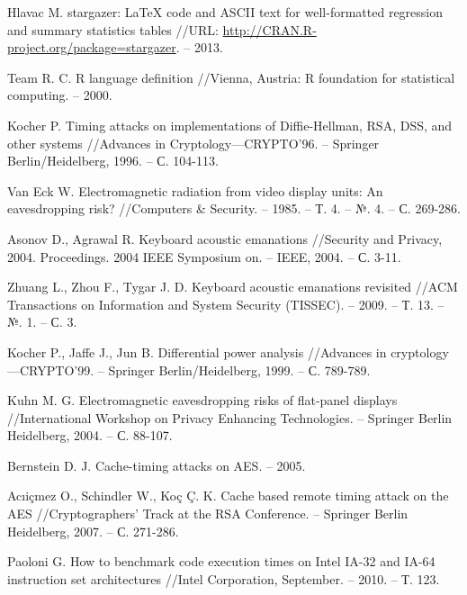 \begingroup
\renewcommand{\section}[2]{\anonsection{Библиографический список}}
\begin{thebibliography}{00}

  Hlavac M. stargazer: LaTeX code and ASCII text for well-formatted regression and summary statistics tables //URL: \url{http://CRAN.R-project.org/package=stargazer}. – 2013.

  Team R. C. R language definition //Vienna, Austria: R foundation for statistical computing. – 2000.

  Kocher P. Timing attacks on implementations of Diffie-Hellman, RSA, DSS, and other systems //Advances in Cryptology—CRYPTO’96. – Springer Berlin/Heidelberg, 1996. – С. 104-113.

  Van Eck W. Electromagnetic radiation from video display units: An eavesdropping risk? //Computers \& Security. – 1985. – Т. 4. – №. 4. – С. 269-286.

  Asonov D., Agrawal R. Keyboard acoustic emanations //Security and Privacy, 2004. Proceedings. 2004 IEEE Symposium on. – IEEE, 2004. – С. 3-11.

  Zhuang L., Zhou F., Tygar J. D. Keyboard acoustic emanations revisited //ACM Transactions on Information and System Security (TISSEC). – 2009. – Т. 13. – №. 1. – С. 3.

  Kocher P., Jaffe J., Jun B. Differential power analysis //Advances in cryptology—CRYPTO’99. – Springer Berlin/Heidelberg, 1999. – С. 789-789.

  Kuhn M. G. Electromagnetic eavesdropping risks of flat-panel displays //International Workshop on Privacy Enhancing Technologies. – Springer Berlin Heidelberg, 2004. – С. 88-107.

  Bernstein D. J. Cache-timing attacks on AES. – 2005.

  Acıiçmez O., Schindler W., Koç Ç. K. Cache based remote timing attack on the AES //Cryptographers’ Track at the RSA Conference. – Springer Berlin Heidelberg, 2007. – С. 271-286.

  Paoloni G. How to benchmark code execution times on Intel IA-32 and IA-64 instruction set architectures //Intel Corporation, September. – 2010. – Т. 123.


\end{thebibliography}

